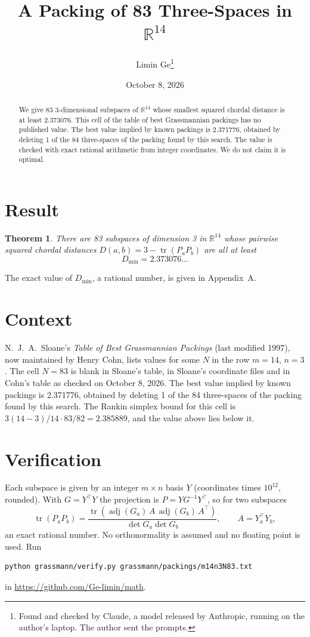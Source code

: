 \documentclass[11pt,a4paper]{article}
\title{A Packing of 83 Three-Spaces in $\mathbb{R}^{14}$}
\author{Limin Ge\thanks{Found and checked by Claude, a model released by Anthropic, running on the author's laptop. The author sent the prompts.}}
\date{October 8, 2026}
\newtheorem*{theorem}{Theorem}
\begin{document}
\maketitle
\begin{abstract}
We give 83 3-dimensional subspaces of $\mathbb{R}^{14}$ whose smallest squared chordal distance is at least 2.373076. This cell of the table of best Grassmannian packings has no published value. The best value implied by known packings is 2.371776, obtained by deleting 1 of the 84 three-spaces of the packing found by this search. The value is checked with exact rational arithmetic from integer coordinates. We do not claim it is optimal.
\end{abstract}

\section{Result}
\begin{theorem}
There are 83 subspaces of dimension 3 in $\mathbb{R}^{14}$ whose pairwise squared chordal distances $D(a,b) = 3 - \operatorname{tr}(P_aP_b)$ are all at least
\[ D_{\min} = 2.373076\ldots \]
\end{theorem}
The exact value of $D_{\min}$, a rational number, is given in Appendix~A.


\section{Context}
N.~J.~A.~Sloane's \emph{Table of Best Grassmannian Packings} (last modified 1997), now maintained by Henry Cohn, lists values for some $N$ in the row $m=14$, $n=3$. The cell $N=83$ is blank in Sloane's table, in Sloane's coordinate files and in Cohn's table as checked on October 8, 2026. The best value implied by known packings is 2.371776, obtained by deleting 1 of the 84 three-spaces of the packing found by this search. The Rankin simplex bound for this cell is $3(14-3)/14\cdot 83/82 = 2.385889$, and the value above lies below it.


\section{Verification}
Each subspace is given by an integer $m\times n$ basis $Y$ (coordinates times $10^{12}$, rounded). With $G=Y^\top Y$ the projection is $P=YG^{-1}Y^\top$, so for two subspaces
\[ \operatorname{tr}(P_aP_b)=\frac{\operatorname{tr}(\operatorname{adj}(G_a)\,A\,\operatorname{adj}(G_b)\,A^\top)}{\det G_a\det G_b},\qquad A=Y_a^\top Y_b, \]
an exact rational number. No orthonormality is assumed and no floating point is used. Run
\begin{verbatim}
python grassmann/verify.py grassmann/packings/m14n3N83.txt
\end{verbatim}
in \url{https://github.com/Ge-limin/math}.
\end{document}
